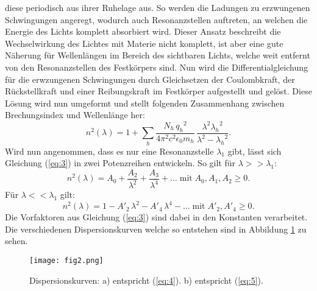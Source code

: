 diese periodisch aus ihrer Ruhelage aus. So werden die Ladungen zu erzwungenen Schwingungen angeregt, wodurch auch Resonanzstellen auftreten, an welchen
die Energie des Lichts komplett absorbiert wird. Dieser Ansatz beschreibt die Wechselwirkung des Lichtes mit Materie nicht komplett, ist aber eine gute
Näherung für Wellenlängen im Bereich des sichtbaren Lichts, welche weit entfernt von den Resonanzstellen des Festkörpers sind. Nun wird die Differentialgleichung
für die erwzungenen Schwingungen durch Gleichsetzen der Coulombkraft, der Rückstellkraft und einer Reibungskraft im Festkörper aufgestellt und gelöst. Diese Lösung
wird nun umgeformt und stellt folgenden Zusammenhang zwischen Brechungsindex und Wellenlänge her:
\begin{equation}
  n^2 (\lambda) = 1 + \sum_h \frac{N_h \, {q_h}^2}{4 {\pi}^2 c^2 {\epsilon}_0 m_h} \, \frac{{\lambda}^2 {{\lambda}_h}^2}{{\lambda}^2 - {{\lambda}_h}^2} .
  \label{eq:3}
\end{equation}
Wird nun angenommen, dass es nur eine Resonanzstelle ${\lambda}_1$ gibt, lässt sich Gleichung (\ref{eq:3}) in zwei Potenzreihen entwickeln. So gilt für
$\lambda >> {\lambda}_1$:
\begin{equation}
n^2 (\lambda) = A_0 + \frac{A_2}{{\lambda}^2} + \frac{A_3}{{\lambda}^4} + \ldots \; \text{mit} \; A_0 , A_1 , A_2 \geq 0 .
\label{eq:4}
\end{equation}
Für $\lambda << {\lambda}_1$ gilt:
\begin{equation}
n^2 (\lambda) = 1 - {A'}_2 \, {\lambda}^2 - {A'}_4 \, {\lambda}^4 - \ldots \; \text{mit} \; {A'}_2 , {A'}_4 \geq 0 .
\label{eq:5}
\end{equation}
Die Vorfaktoren aus Gleichung (\ref{eq:3}) sind dabei in den Konstanten verarbeitet.
Die verschiedenen Dispersionskurven welche so entstehen sind in Abbildung \ref{fig:2} zu sehen.
\begin{figure}
  \centering
  \texttt{[image: fig2.png]}
  \caption{Dispersionskurven: a) entspricht (\ref{eq:4}). b) entspricht (\ref{eq:5}). \cite{1}}
  \label{fig:2}
\end{figure}
